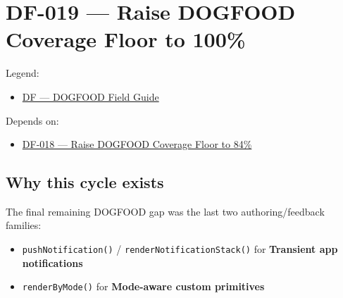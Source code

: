\chapter{DF-019 --- Raise DOGFOOD Coverage Floor to 100\%}\label{record-081}

\smallskip

Legend:

\begin{itemize}
\tightlist
\item
  \href{https://github.com/flyingrobots/bijou/blob/1853ad902f6bf219326409e7f743a5a1d6517dbc/docs/legends/DF-dogfood-field-guide.md}{DF --- DOGFOOD Field Guide}
\end{itemize}

Depends on:

\begin{itemize}
\tightlist
\item
  \href{https://github.com/flyingrobots/bijou/blob/cbd70612140e7a450d764b3c7be1c6af878b99bc/docs/design/DF-018-raise-dogfood-coverage-floor-to-84-percent.md}{DF-018 --- Raise DOGFOOD Coverage Floor to 84\%}
\end{itemize}

\section{Why this cycle exists}\label{record-081-why-this-cycle-exists}

The final remaining DOGFOOD gap was the last two authoring/feedback families:

\begin{itemize}
\tightlist
\item
  \texttt{p\allowbreak{}u\allowbreak{}s\allowbreak{}h\allowbreak{}N\allowbreak{}o\allowbreak{}t\allowbreak{}i\allowbreak{}f\allowbreak{}i\allowbreak{}c\allowbreak{}a\allowbreak{}t\allowbreak{}i\allowbreak{}o\allowbreak{}n\allowbreak{}(\allowbreak{})} / \texttt{r\allowbreak{}e\allowbreak{}n\allowbreak{}d\allowbreak{}e\allowbreak{}r\allowbreak{}N\allowbreak{}o\allowbreak{}t\allowbreak{}i\allowbreak{}f\allowbreak{}i\allowbreak{}c\allowbreak{}a\allowbreak{}t\allowbreak{}i\allowbreak{}o\allowbreak{}n\allowbreak{}S\allowbreak{}t\allowbreak{}a\allowbreak{}c\allowbreak{}k\allowbreak{}(\allowbreak{})} for \textbf{Transient app notifications}
\item
  \texttt{r\allowbreak{}e\allowbreak{}n\allowbreak{}d\allowbreak{}e\allowbreak{}r\allowbreak{}B\allowbreak{}y\allowbreak{}M\allowbreak{}o\allowbreak{}d\allowbreak{}e\allowbreak{}(\allowbreak{})} for \textbf{Mode-aware custom primitives}
\end{itemize}

